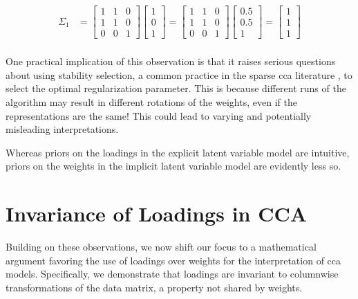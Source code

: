 \begin{align}
    \Sigma_{1} &= \begin{bmatrix}
                         1 & 1 & 0 \\
                         1 & 1 & 0 \\
                         0 & 0 & 1
    \end{bmatrix}\begin{bmatrix}
                     1 \\
                     0 \\
                     1
    \end{bmatrix}=
    \begin{bmatrix}
        1 & 1 & 0 \\
        1 & 1 & 0 \\
        0 & 0 & 1
    \end{bmatrix}\begin{bmatrix}
                     0.5 \\
                     0.5 \\
                     1
    \end{bmatrix}= \begin{bmatrix}
                        1 \\
                        1 \\
                        1
    \end{bmatrix} \\
\end{align}

One practical implication of this observation is that it raises serious questions about using stability selection, a common practice in the sparse \acrshort{cca} literature \citep{mihalik2020multiple, deng2021sparse}, to select the optimal regularization parameter.
This is because different runs of the algorithm may result in different rotations of the weights, even if the representations are the same!
This could lead to varying and potentially misleading interpretations.

Whereas priors on the loadings in the explicit latent variable model are intuitive, priors on the weights in the implicit latent variable model are evidently less so.

\section{Invariance of Loadings in CCA}

Building on these observations, we now shift our focus to a mathematical argument favoring the use of \gls{loadings} over weights for the interpretation of \acrshort{cca} models.
Specifically, we demonstrate that \gls{loadings} are invariant to columnwise transformations of the data matrix, a property not shared by weights.


